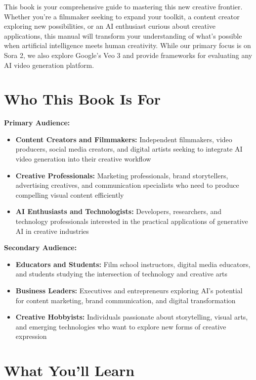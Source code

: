 \documentclass[11pt,a4paper,openright]{book}
\begin{document}
This book is your comprehensive guide to mastering this new creative frontier. Whether you're a filmmaker seeking to expand your toolkit, a content creator exploring new possibilities, or an AI enthusiast curious about creative applications, this manual will transform your understanding of what's possible when artificial intelligence meets human creativity. While our primary focus is on Sora 2, we also explore Google's Veo 3 and provide frameworks for evaluating any AI video generation platform.

\section*{Who This Book Is For}

\textbf{Primary Audience:}
\begin{itemize}
\item \textbf{Content Creators and Filmmakers:} Independent filmmakers, video producers, social media creators, and digital artists seeking to integrate AI video generation into their creative workflow
\item \textbf{Creative Professionals:} Marketing professionals, brand storytellers, advertising creatives, and communication specialists who need to produce compelling visual content efficiently
\item \textbf{AI Enthusiasts and Technologists:} Developers, researchers, and technology professionals interested in the practical applications of generative AI in creative industries
\end{itemize}

\textbf{Secondary Audience:}
\begin{itemize}
\item \textbf{Educators and Students:} Film school instructors, digital media educators, and students studying the intersection of technology and creative arts
\item \textbf{Business Leaders:} Executives and entrepreneurs exploring AI's potential for content marketing, brand communication, and digital transformation
\item \textbf{Creative Hobbyists:} Individuals passionate about storytelling, visual arts, and emerging technologies who want to explore new forms of creative expression
\end{itemize}

\section*{What You'll Learn}
\end{document}
